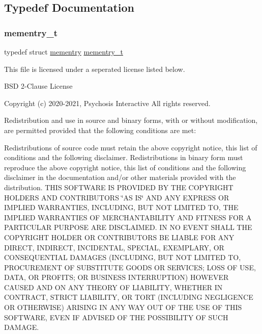 \subsection{Typedef Documentation}
\mbox{\label{a00119_a876b6ee19692762a87e4673911f9b8da_a876b6ee19692762a87e4673911f9b8da}} 
\subsubsection{\texorpdfstring{mementry\+\_\+t}{mementry\_t}}
{\footnotesize\ttfamily typedef struct \hyperlink{a00179}{mementry}  \hyperlink{a00119_a876b6ee19692762a87e4673911f9b8da_a876b6ee19692762a87e4673911f9b8da}{mementry\+\_\+t}}



This file is licensed under a seperated license listed below. 

B\+SD 2-\/\+Clause License

Copyright (c) 2020-\/2021, Psychosis Interactive All rights reserved.

Redistribution and use in source and binary forms, with or without modification, are permitted provided that the following conditions are met\+:

Redistributions of source code must retain the above copyright notice, this list of conditions and the following disclaimer. Redistributions in binary form must reproduce the above copyright notice, this list of conditions and the following disclaimer in the documentation and/or other materials provided with the distribution. T\+H\+IS S\+O\+F\+T\+W\+A\+RE IS P\+R\+O\+V\+I\+D\+ED BY T\+HE C\+O\+P\+Y\+R\+I\+G\+HT H\+O\+L\+D\+E\+RS A\+ND C\+O\+N\+T\+R\+I\+B\+U\+T\+O\+RS \char`\"{}\+A\+S I\+S\char`\"{} A\+ND A\+NY E\+X\+P\+R\+E\+SS OR I\+M\+P\+L\+I\+ED W\+A\+R\+R\+A\+N\+T\+I\+ES, I\+N\+C\+L\+U\+D\+I\+NG, B\+UT N\+OT L\+I\+M\+I\+T\+ED TO, T\+HE I\+M\+P\+L\+I\+ED W\+A\+R\+R\+A\+N\+T\+I\+ES OF M\+E\+R\+C\+H\+A\+N\+T\+A\+B\+I\+L\+I\+TY A\+ND F\+I\+T\+N\+E\+SS F\+OR A P\+A\+R\+T\+I\+C\+U\+L\+AR P\+U\+R\+P\+O\+SE A\+RE D\+I\+S\+C\+L\+A\+I\+M\+ED. IN NO E\+V\+E\+NT S\+H\+A\+LL T\+HE C\+O\+P\+Y\+R\+I\+G\+HT H\+O\+L\+D\+ER OR C\+O\+N\+T\+R\+I\+B\+U\+T\+O\+RS BE L\+I\+A\+B\+LE F\+OR A\+NY D\+I\+R\+E\+CT, I\+N\+D\+I\+R\+E\+CT, I\+N\+C\+I\+D\+E\+N\+T\+AL, S\+P\+E\+C\+I\+AL, E\+X\+E\+M\+P\+L\+A\+RY, OR C\+O\+N\+S\+E\+Q\+U\+E\+N\+T\+I\+AL D\+A\+M\+A\+G\+ES (I\+N\+C\+L\+U\+D\+I\+NG, B\+UT N\+OT L\+I\+M\+I\+T\+ED TO, P\+R\+O\+C\+U\+R\+E\+M\+E\+NT OF S\+U\+B\+S\+T\+I\+T\+U\+TE G\+O\+O\+DS OR S\+E\+R\+V\+I\+C\+ES; L\+O\+SS OF U\+SE, D\+A\+TA, OR P\+R\+O\+F\+I\+TS; OR B\+U\+S\+I\+N\+E\+SS I\+N\+T\+E\+R\+R\+U\+P\+T\+I\+ON) H\+O\+W\+E\+V\+ER C\+A\+U\+S\+ED A\+ND ON A\+NY T\+H\+E\+O\+RY OF L\+I\+A\+B\+I\+L\+I\+TY, W\+H\+E\+T\+H\+ER IN C\+O\+N\+T\+R\+A\+CT, S\+T\+R\+I\+CT L\+I\+A\+B\+I\+L\+I\+TY, OR T\+O\+RT (I\+N\+C\+L\+U\+D\+I\+NG N\+E\+G\+L\+I\+G\+E\+N\+CE OR O\+T\+H\+E\+R\+W\+I\+SE) A\+R\+I\+S\+I\+NG IN A\+NY W\+AY O\+UT OF T\+HE U\+SE OF T\+H\+IS S\+O\+F\+T\+W\+A\+RE, E\+V\+EN IF A\+D\+V\+I\+S\+ED OF T\+HE P\+O\+S\+S\+I\+B\+I\+L\+I\+TY OF S\+U\+CH D\+A\+M\+A\+GE. 

